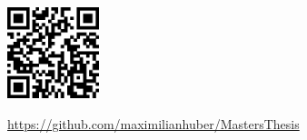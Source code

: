 \newpage\thispagestyle{empty}
~\vfill
\begin{center}
  \includegraphics[width=0.2\textwidth]{qrCode.eps}
\end{center}
\begin{center}
  \url{https://github.com/maximilianhuber/MastersThesis}
\end{center}

